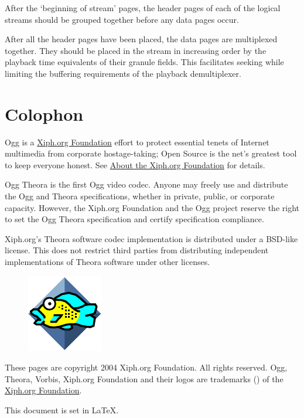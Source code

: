 \documentclass[11pt,letterpaper]{book}
\numberwithin{equation}{chapter}
\numberwithin{figure}{chapter}
\numberwithin{table}{chapter}
\begin{document}
After the `beginning of stream' pages, the header pages of each of
 the logical streams should be grouped together before any data pages
 occur.

After all the header pages have been placed,
 the data pages are multiplexed together.
They should be placed in the stream in increasing order by the playback
 time equivalents of their granule fields.
This facilitates seeking while limiting the buffering requirements of the
 playback demultiplexer.

\clearpage
\chapter{Colophon}

Ogg is a \href{http://www.xiph.org}{Xiph.org Foundation} effort to protect
 essential tenets of Internet multimedia from corporate hostage-taking; Open
 Source is the net's greatest tool to keep everyone honest.
See \href{http://www.xiph.org/about.html}{About the Xiph.org Foundation} for
 details.

Ogg Theora is the first Ogg video codec.
Anyone may freely use and distribute the Ogg and Theora specifications, whether
 in private, public, or corporate capacity.
However, the Xiph.org Foundation and the Ogg project reserve the right to set
 the Ogg Theora specification and certify specification compliance.

Xiph.org's Theora software codec implementation is distributed under a BSD-like
 license.
This does not restrict third parties from distributing independent
 implementations of Theora software under other licenses.

\begin{figure}
\includegraphics{xifish}
\end{figure}

These pages are copyright \textcopyright{} 2004 Xiph.org Foundation.
All rights reserved.
Ogg, Theora, Vorbis, Xiph.org Foundation and their logos are trademarks
 (\texttrademark) of the \href{http://www.xiph.org}{Xiph.org Foundation}.

This document is set in \LaTeX.



\clearpage

\end{document}

